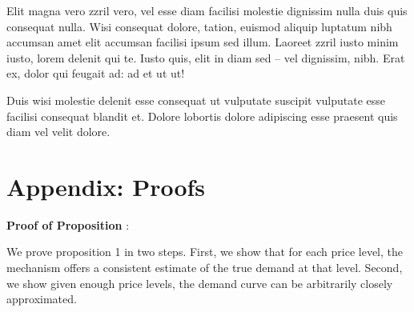 Elit magna vero zzril vero, vel esse diam facilisi molestie dignissim nulla duis quis consequat nulla. Wisi consequat dolore, tation, euismod aliquip luptatum nibh accumsan amet elit accumsan facilisi ipsum sed illum. Laoreet zzril iusto minim iusto, lorem delenit qui te. Iusto quis, elit in diam sed -- vel dignissim, nibh. Erat ex, dolor qui feugait ad: ad et ut ut!

Duis wisi molestie delenit esse consequat ut vulputate suscipit vulputate esse facilisi consequat blandit et. Dolore lobortis dolore adipiscing esse praesent quis diam vel velit dolore.


\newpage

\begin{singlespace}


\end{singlespace}

\newpage

\appendix

\section*{Appendix: Proofs}

\textbf{Proof of Proposition} \textbf{}:

We prove proposition 1 in two steps. First, we show that for each
price level, the mechanism offers a consistent estimate of the true
demand at that level. Second, we show given enough price levels, the
demand curve can be arbitrarily closely approximated.
